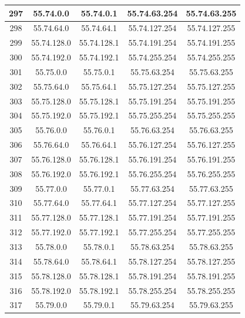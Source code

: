 \documentclass[letterpaper,12pt]{article}
\begin{document}
\begin{center}
\begin{longtable}{|c|c|c|c|c|}
                297 & 55.74.0.0 & 55.74.0.1 & 55.74.63.254 & 55.74.63.255 \\ \hline
                298 & 55.74.64.0 & 55.74.64.1 & 55.74.127.254 & 55.74.127.255 \\ \hline
                299 & 55.74.128.0 & 55.74.128.1 & 55.74.191.254 & 55.74.191.255 \\ \hline
                300 & 55.74.192.0 & 55.74.192.1 & 55.74.255.254 & 55.74.255.255 \\ \hline
                301 & 55.75.0.0 & 55.75.0.1 & 55.75.63.254 & 55.75.63.255 \\ \hline
                302 & 55.75.64.0 & 55.75.64.1 & 55.75.127.254 & 55.75.127.255 \\ \hline
                303 & 55.75.128.0 & 55.75.128.1 & 55.75.191.254 & 55.75.191.255 \\ \hline
                304 & 55.75.192.0 & 55.75.192.1 & 55.75.255.254 & 55.75.255.255 \\ \hline
                305 & 55.76.0.0 & 55.76.0.1 & 55.76.63.254 & 55.76.63.255 \\ \hline
                306 & 55.76.64.0 & 55.76.64.1 & 55.76.127.254 & 55.76.127.255 \\ \hline
                307 & 55.76.128.0 & 55.76.128.1 & 55.76.191.254 & 55.76.191.255 \\ \hline
                308 & 55.76.192.0 & 55.76.192.1 & 55.76.255.254 & 55.76.255.255 \\ \hline
                309 & 55.77.0.0 & 55.77.0.1 & 55.77.63.254 & 55.77.63.255 \\ \hline
                310 & 55.77.64.0 & 55.77.64.1 & 55.77.127.254 & 55.77.127.255 \\ \hline
                311 & 55.77.128.0 & 55.77.128.1 & 55.77.191.254 & 55.77.191.255 \\ \hline
                312 & 55.77.192.0 & 55.77.192.1 & 55.77.255.254 & 55.77.255.255 \\ \hline
                313 & 55.78.0.0 & 55.78.0.1 & 55.78.63.254 & 55.78.63.255 \\ \hline
                314 & 55.78.64.0 & 55.78.64.1 & 55.78.127.254 & 55.78.127.255 \\ \hline
                315 & 55.78.128.0 & 55.78.128.1 & 55.78.191.254 & 55.78.191.255 \\ \hline
                316 & 55.78.192.0 & 55.78.192.1 & 55.78.255.254 & 55.78.255.255 \\ \hline
                317 & 55.79.0.0 & 55.79.0.1 & 55.79.63.254 & 55.79.63.255 \\ \hline

\end{longtable}
\end{center}
\end{document}

